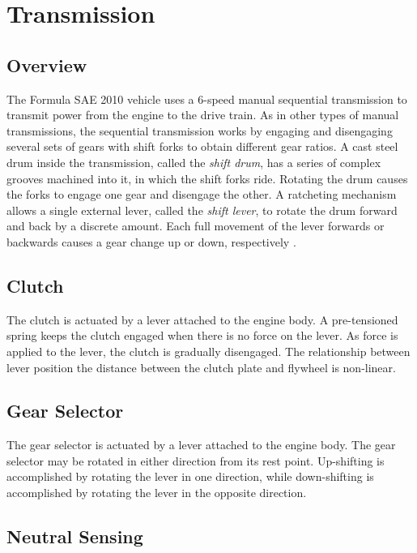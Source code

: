 \section{Transmission}

\subsection{Overview}

The Formula SAE 2010 vehicle uses a 6-speed manual sequential transmission to transmit power from the engine to the drive train. As in other types of manual transmissions, the sequential transmission works by engaging and disengaging several sets of gears with shift forks to obtain different gear ratios. A cast steel drum inside the transmission, called the \emph{shift drum}, has a series of complex grooves machined into it, in which the shift forks ride. Rotating the drum causes the forks to engage one gear and disengage the other. A ratcheting mechanism allows a single external lever, called the \emph{shift lever}, to rotate the drum forward and back by a discrete amount. Each full movement of the lever forwards or backwards causes a gear change up or down, respectively \cite{HowtoManualTransmission, cbr600}.

\subsection{Clutch}

The clutch is actuated by a lever attached to the engine body. A pre-tensioned spring keeps the clutch engaged when there is no force on the lever. As force is applied to the lever, the clutch is gradually disengaged. The relationship between lever position the distance between the clutch plate and flywheel is non-linear. 

\subsection{Gear Selector}

The gear selector is actuated by a lever attached to the engine body. The gear selector may be rotated in either direction from its rest point. Up-shifting is accomplished by rotating the lever in one direction, while down-shifting is accomplished by rotating the lever in the opposite direction. 

\subsection{Neutral Sensing}

